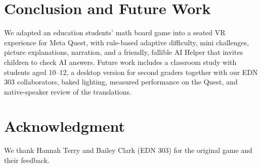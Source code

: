 \documentclass[conference]{IEEEtran}
\begin{document}
\section{Conclusion and Future Work}
We adapted an education students' math board game into a seated VR experience for Meta Quest, with rule-based adaptive difficulty, mini challenges, picture explanations, narration, and a friendly, fallible AI Helper that invites children to check AI answers. Future work includes a classroom study with students aged 10--12, a desktop version for second graders together with our EDN 303 collaborators, baked lighting, measured performance on the Quest, and native-speaker review of the translations.

\section*{Acknowledgment}
We thank Hannah Terry and Bailey Clark (EDN 303) for the original game and their feedback.
\end{document}
